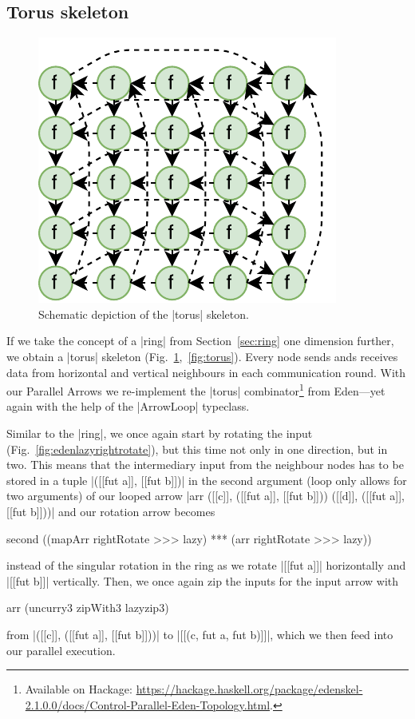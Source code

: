 \subsection{Torus skeleton}\label{sec:torus}
\begin{figure}
	\includegraphics[scale=0.75]{images/torus}
	\caption{Schematic depiction of the |torus| skeleton.}
	\label{fig:ringTorusImg}
\end{figure}
If we take the concept of a |ring| from Section~\ref{sec:ring} one dimension further, we obtain a |torus| skeleton (Fig.~\ref{fig:ringTorusImg},~\ref{fig:torus}). Every node sends ands receives data from horizontal and vertical neighbours in each communication round.
With our Parallel Arrows we re-implement the |torus| combinator\footnote{Available on Hackage: \url{https://hackage.haskell.org/package/edenskel-2.1.0.0/docs/Control-Parallel-Eden-Topology.html}.} from Eden---yet again with the help of the |ArrowLoop| typeclass.

Similar to the |ring|, we once again start by rotating the input (Fig.~\ref{fig:edenlazyrightrotate}), but this time not only in one direction, but in two. This means that the intermediary input from the neighbour nodes has to be stored in a tuple |([[fut a]], [[fut b]])| in the second argument (loop only allows for two arguments) of our looped arrow |arr ([[c]], ([[fut a]], [[fut b]])) ([[d]], ([[fut a]], [[fut b]]))| and our rotation arrow becomes 
\begin{code}
second ((mapArr rightRotate >>> lazy) *** (arr rightRotate >>> lazy))
\end{code}
instead of the singular rotation in the ring as we rotate |[[fut a]]| horizontally and |[[fut b]]| vertically. Then, we once again zip the inputs for the input arrow with 
\begin{code}
arr (uncurry3 zipWith3 lazyzip3)
\end{code}
from |([[c]], ([[fut a]], [[fut b]]))| to |[[(c, fut a, fut b)]]|, which we then feed into our parallel execution.

